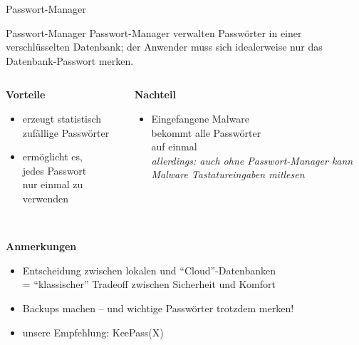 \begin{frame}{Passwort-Manager}
  \begin{block}{Passwort-Manager}
    Passwort-Manager verwalten Passwörter in einer verschlüsselten Datenbank; der Anwender muss sich idealerweise nur das Datenbank-Passwort merken.
  \end{block}
  \begin{columns}
    \begin{column}{.5\textwidth}
      \pause
      \textbf{Vorteile}
      \begin{itemize}
        \small
        \item erzeugt statistisch zufällige Passwörter
        \item ermöglicht es,\\jedes Passwort\\nur einmal zu verwenden
      \end{itemize}
    \end{column}
    \begin{column}{.5\textwidth}
      \pause
      \textbf{Nachteil}
      \begin{itemize}
        \small
        \item Eingefangene Malware\\bekommt alle Passwörter\\auf einmal\\
          \textit{allerdings: auch ohne Passwort-Manager kann Malware Tastatureingaben mitlesen}
      \end{itemize}
    \end{column}
  \end{columns}
  ~\\
  \pause
  \textbf{Anmerkungen}
  \begin{itemize}
    \small
    \item Entscheidung zwischen lokalen und ``Cloud''-Datenbanken\\ = ``klassischer'' Tradeoff zwischen Sicherheit und Komfort
    \item Backups machen -- und wichtige Passwörter trotzdem merken!
    \item unsere Empfehlung: KeePass(X)
  \end{itemize}
\end{frame}

\endinput
